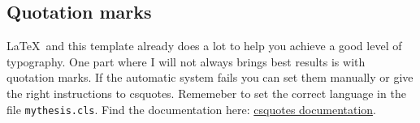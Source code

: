 \documentclass[../main.tex]{subfiles}
\begin{document}
\subsection{Quotation marks}
\LaTeX~and this template already does a lot to help you achieve a good level of typography. One part where I will not always brings best results is with quotation marks. If the automatic system fails you can set them manually or give the right instructions to csquotes. Rememeber to set the correct language in the file \texttt{mythesis.cls}. Find the documentation here: \href{https://www.ctan.org/pkg/csquotes?lang=de}{csquotes documentation}.
\end{document}
